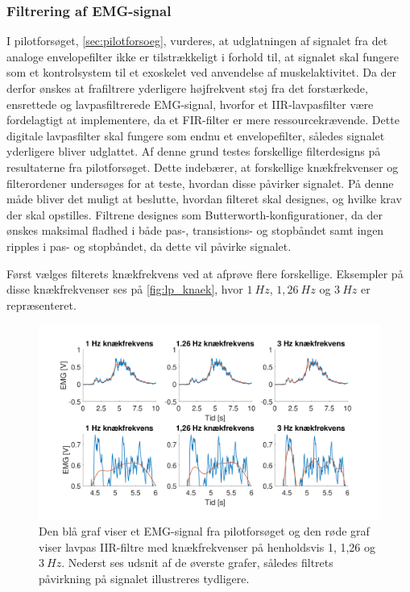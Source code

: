 \subsubsection{Filtrering af EMG-signal} \label{sec:lavpas_krav}
I pilotforsøget, \autoref{sec:pilotforsoeg}, vurderes, at udglatningen af signalet fra det analoge envelopefilter ikke er tilstrækkeligt i forhold til, at signalet skal fungere som et kontrolsystem til et exoskelet ved anvendelse af muskelaktivitet. 
Da der derfor ønskes at frafiltrere yderligere højfrekvent støj fra det forstærkede, ensrettede og lavpasfiltrerede EMG-signal, hvorfor et IIR-lavpasfilter være fordelagtigt at implementere, da et FIR-filter er mere ressourcekrævende. 
Dette digitale lavpasfilter skal fungere som endnu et envelopefilter, således signalet yderligere bliver udglattet. 
Af denne grund testes forskellige filterdesigns på resultaterne fra pilotforsøget. 
Dette indebærer, at forskellige knækfrekvenser og filterordener undersøges for at teste, hvordan disse påvirker signalet. 
På denne måde bliver det muligt at beslutte, hvordan filteret skal designes, og hvilke krav der skal opstilles. 
Filtrene designes som Butterworth-konfigurationer, da der ønskes maksimal fladhed i både pas-, transistions- og stopbåndet samt ingen ripples i pas- og stopbåndet, da dette vil påvirke signalet.

Først vælges filterets knækfrekvens ved at afprøve flere forskellige. Eksempler på disse knækfrekvenser ses på \autoref{fig:lp_knaek}, hvor $1~Hz$, $1,26~Hz$ og $3~Hz$ er repræsenteret. 

\begin{figure} [H]
\centering
\includegraphics[width=1.0\textwidth]{figures/problemloesning/lavpas_knaek.pdf}
\caption{Den blå graf viser et EMG-signal fra pilotforsøget og den røde graf viser lavpas IIR-filtre med knækfrekvenser på henholdsvis 1, 1,26 og $3~Hz$. Nederst ses udsnit af de øverste grafer, således filtrets påvirkning på signalet illustreres tydligere.}
\label{fig:lp_knaek}
\end{figure} 

